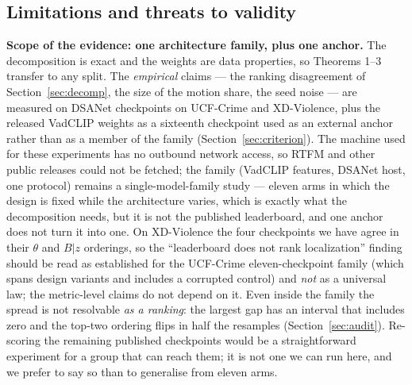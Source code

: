 \documentclass[number,preprint,12pt]{elsarticle}
\begin{document}
\subsection{Limitations and threats to validity}\label{sec:limits}

\textbf{Scope of the evidence: one architecture family, plus one anchor.} The
decomposition is exact and the weights are data properties, so Theorems 1--3
transfer to any split. The \emph{empirical} claims --- the ranking disagreement of
Section~\ref{sec:decomp}, the size of the motion share, the seed noise --- are
measured on DSANet checkpoints on UCF-Crime and XD-Violence, plus the released
VadCLIP weights as a sixteenth checkpoint used as an external anchor rather
than as a member of the family (Section~\ref{sec:criterion}). The machine used
for these experiments has no outbound network access, so RTFM and other public
releases could not be fetched; the family (VadCLIP features, DSANet host, one
protocol) remains a single-model-family study --- eleven arms in which the
design is fixed while the architecture varies, which is exactly what the
decomposition needs, but it is not the published leaderboard, and one anchor
does not turn it into one. On XD-Violence the four checkpoints we have agree in
their \(\theta\) and \(B|z\) orderings, so the ``leaderboard does not rank
localization'' finding should be read as established for the UCF-Crime
eleven-checkpoint family (which spans design variants and includes a corrupted
control) and \emph{not} as a universal law; the metric-level claims do not depend on
it. Even inside the family the spread is not resolvable \emph{as a ranking}: the
largest gap has an interval that includes zero and the top-two ordering flips
in half the resamples (Section~\ref{sec:audit}). Re-scoring the remaining
published checkpoints would be a straightforward experiment for a group that
can reach them; it is not one we can run here, and we prefer to say so than to
generalise from eleven arms.
\end{document}
